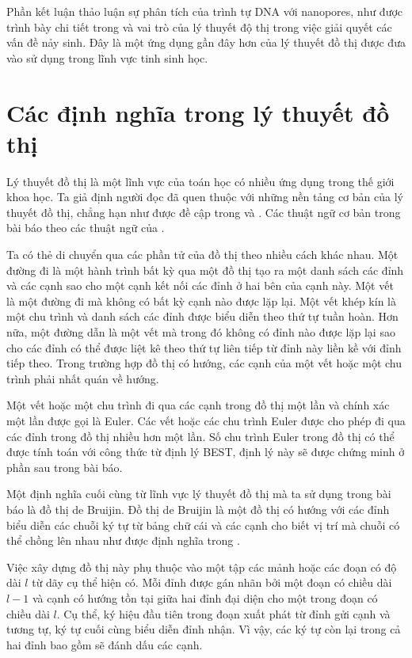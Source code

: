 \documentclass[14pt, a4paper]{article}
\numberwithin{equation}{section}
\numberwithin{figure}{section}
\numberwithin{dl}{section}
\numberwithin{md}{section}
\numberwithin{bd}{section}
\numberwithin{dn}{section}
\numberwithin{hq}{section}
\begin{document}
    Phần kết luận thảo luận sự phân tích của trình tự DNA với nanopores, như được trình bày chi tiết trong \cite{bokhari2005parallel} và vai trò của lý thuyết độ thị trong việc giải quyết các vấn đề nảy sinh.
    Đây là một ứng dụng gần đây hơn của lý thuyết đồ thị được đưa vào sử dụng trong lĩnh vực tinh sinh học.
    
    \section{Các định nghĩa trong lý thuyết đồ thị}

    Lý thuyết đồ thị là một lĩnh vực của toán học có nhiều ứng dụng trong thế giới khoa học.
    Ta giả định người đọc đã quen thuộc với những nền tảng cơ bản của lý thuyết đồ thị, chẳng hạn như được đề cập trong \cite{tucker2006applied} và \cite{west2001introduction}.
    Các thuật ngữ cơ bản trong bài báo theo các thuật ngữ của \cite{west2001introduction}.

    Ta có thẻ di chuyển qua các phần tử của đồ thị theo nhiều cách khác nhau.
    Một đường đi là một hành trình bất kỳ qua một đồ thị tạo ra một danh sách các đỉnh và các cạnh sao cho một cạnh kết nối các đỉnh ở hai bên của cạnh này.
    Một vết là một đường đi mà không có bất kỳ cạnh nào được lặp lại.
    Một vết khép kín là một chu trình và danh sách các đỉnh được biểu diễn theo thứ tự tuần hoàn.
    Hơn nữa, một đường dẫn là một vết mà trong đó không có đỉnh nào được lặp lại sao cho các đỉnh có thể được liệt kê theo thứ tự liên tiếp từ đỉnh này liền kề với đỉnh tiếp theo.
    Trong trường hợp đồ thị có hướng, các cạnh của một vết hoặc một chu trình phải nhất quán về hướng.

    Một vết hoặc một chu trình đi qua các cạnh trong đồ thị một lần và chính xác một lần được gọi là Euler.
    Các vết hoặc các chu trình Euler được cho phép đi qua các đỉnh trong đồ thị nhiều hơn một lần.
    Số chu trình Euler trong đồ thị có thể được tính toán với công thức từ định lý BEST, định lý này sẽ được chứng minh ở phần sau trong bài báo.

    Một định nghĩa cuối cùng từ lĩnh vực lý thuyết đồ thị mà ta sử dụng trong bài báo là đồ thị de Bruijin.
    Đồ thị de Bruijin là một đồ thị có hướng với các đỉnh biểu diễn các chuỗi ký tự từ bảng chữ cái và các cạnh cho biết vị trí mà chuỗi có thể chồng lên nhau như được định nghĩa trong \cite{de1946combinatorial}.

    Việc xây dựng đồ thị này phụ thuộc vào một tập các mảnh hoặc các đoạn có độ dài $l$ từ dãy cụ thể hiện có.
    Mỗi đỉnh được gán nhãn bởi một đoạn có chiều dài $l-1$ và cạnh có hướng tồn tại giữa hai đỉnh đại diện cho một trong đoạn có chiều dài $l$.
    Cụ thể, ký hiệu đầu tiên trong đoạn xuất phát từ đỉnh gửi cạnh và tương tự, ký tự cuối cùng biểu diễn đỉnh nhận.
    Vì vậy, các ký tự còn lại trong cả hai đỉnh bao gồm sẽ đánh dấu các cạnh.
\end{document}
